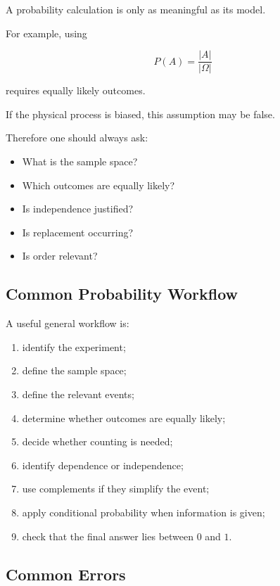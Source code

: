 A probability calculation is only as meaningful as its model.

For example, using

\[
P(A)
=
\frac{|A|}{|\Omega|}
\]

requires equally likely outcomes.

If the physical process is biased, this assumption may be false.

Therefore one should always ask:

\begin{itemize}
    \item What is the sample space?
    \item Which outcomes are equally likely?
    \item Is independence justified?
    \item Is replacement occurring?
    \item Is order relevant?
\end{itemize}

\subsection{Common Probability Workflow}
\label{subsec:elementary-probability-workflow}

A useful general workflow is:

\begin{enumerate}
    \item identify the experiment;
    \item define the sample space;
    \item define the relevant events;
    \item determine whether outcomes are equally likely;
    \item decide whether counting is needed;
    \item identify dependence or independence;
    \item use complements if they simplify the event;
    \item apply conditional probability when information is given;
    \item check that the final answer lies between \(0\) and \(1\).
\end{enumerate}

\subsection{Common Errors}
\label{subsec:elementary-probability-common-errors}

